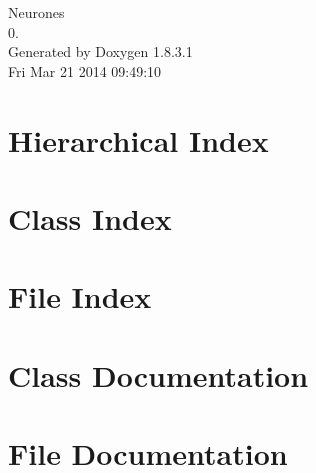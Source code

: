 \documentclass{book}
\begin{document}
\hypersetup{pageanchor=false,citecolor=blue}
\begin{titlepage}
\vspace*{7cm}
\begin{center}
{\Large Neurones \\[1ex]\large 0. }\\
\vspace*{1cm}
{\large Generated by Doxygen 1.8.3.1}\\
\vspace*{0.5cm}
{\small Fri Mar 21 2014 09:49:10}\\
\end{center}
\end{titlepage}
\clearemptydoublepage
{}
\tableofcontents
\clearemptydoublepage
{}
\hypersetup{pageanchor=true,citecolor=blue}
\chapter{Hierarchical Index}

\chapter{Class Index}

\chapter{File Index}

\chapter{Class Documentation}














\chapter{File Documentation}
























\printindex
\end{document}
